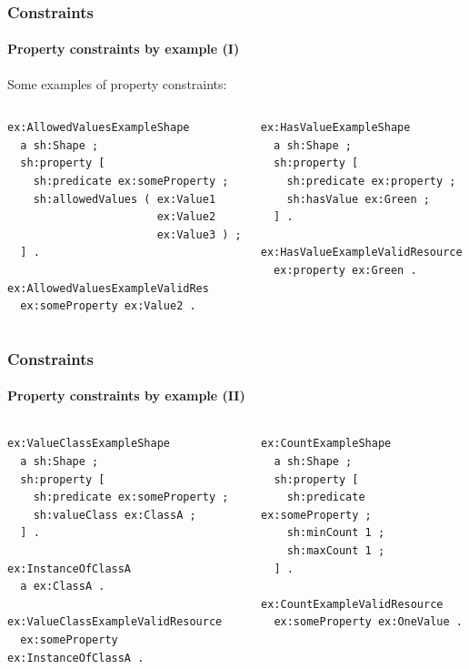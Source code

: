 \documentclass{beamer}
\begin{document}
\begin{frame}[fragile]
  \frametitle{Constraints}
  \framesubtitle{Property constraints by example (I)}

  Some examples of property constraints:

  \begin{columns}[t]

    \begin{Verbatim}[fontsize=\footnotesize]
ex:AllowedValuesExampleShape
  a sh:Shape ;
  sh:property [
    sh:predicate ex:someProperty ;
    sh:allowedValues ( ex:Value1
                       ex:Value2
                       ex:Value3 ) ;
  ] .

ex:AllowedValuesExampleValidRes
  ex:someProperty ex:Value2 .
    \end{Verbatim}


    \begin{Verbatim}[fontsize=\footnotesize]
ex:HasValueExampleShape
  a sh:Shape ;
  sh:property [
    sh:predicate ex:property ;
    sh:hasValue ex:Green ;
  ] .

ex:HasValueExampleValidResource
  ex:property ex:Green .
    \end{Verbatim}
  \end{columns}
\end{frame}

\begin{frame}[fragile]
  \frametitle{Constraints}
  \framesubtitle{Property constraints by example (II)}

  \begin{columns}[t]

    \begin{Verbatim}[fontsize=\footnotesize]
ex:ValueClassExampleShape
  a sh:Shape ;
  sh:property [
    sh:predicate ex:someProperty ;
    sh:valueClass ex:ClassA ;
  ] .

ex:InstanceOfClassA
  a ex:ClassA .

ex:ValueClassExampleValidResource
  ex:someProperty ex:InstanceOfClassA .
    \end{Verbatim}


    \begin{Verbatim}[fontsize=\footnotesize]
ex:CountExampleShape
  a sh:Shape ;
  sh:property [
    sh:predicate ex:someProperty ;
    sh:minCount 1 ;
    sh:maxCount 1 ;
  ] .

ex:CountExampleValidResource
  ex:someProperty ex:OneValue .
    \end{Verbatim}
  \end{columns}
\end{frame}
\end{document}
